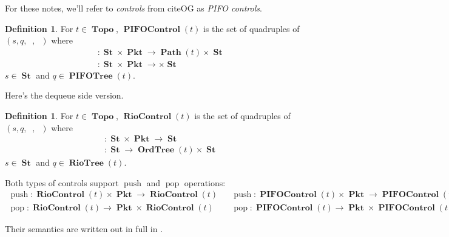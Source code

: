 \documentclass{amsart}
\DeclareMathOperator{\push}{\mathrm{push}}
\DeclareMathOperator{\pop}{\mathrm{pop}}
\DeclareMathOperator{\Pkt}{\mathbf{Pkt}}
\DeclareMathOperator{\Topo}{\mathbf{Topo}}
\DeclareMathOperator{\Path}{\mathbf{Path}}
\DeclareMathOperator{\PIFOTree}{\mathbf{PIFOTree}}
\DeclareMathOperator{\St}{\mathbf{St}}
\DeclareMathOperator{\zin}{z_{\mathrm{in}}}
\DeclareMathOperator{\zout}{z_{\mathrm{out}}}
\DeclareMathOperator{\RioTree}{\mathbf{RioTree}}
\DeclareMathOperator{\OrdTree}{\mathbf{OrdTree}}
\DeclareMathOperator{\PIFOControl}{\mathbf{PIFOControl}}
\DeclareMathOperator{\RioControl}{\mathbf{RioControl}}
\theoremstyle{definition}
\newtheorem{dfn}[thm]{Definition}
\begin{document}
For these notes, we'll refer to \emph{controls} from citeOG as \emph{PIFO controls}.

\begin{dfn}
    For $t \in \Topo$, $\PIFOControl(t)$ is the set of quadruples of $(s, q, \zin, \zout)$ where 
    \begin{align*}
        \zin &: \St \times \Pkt \to \Path(t) \times \St\\
        \zout &: \St \times \Pkt \to \times \St
    \end{align*}
    $s \in \St$ and $q \in \PIFOTree(t)$.
\end{dfn}

Here's the dequeue side version.

\begin{dfn}
    For $t \in \Topo$, $\RioControl(t)$ is the set of quadruples of $(s, q, \zin, \zout)$ where 
    \begin{align*}
        \zin &: \St \times \Pkt \to \St\\
        \zout &: \St \to \OrdTree(t) \times \St
    \end{align*}
    $s \in \St$ and $q \in \RioTree(t)$.
\end{dfn}

Both types of controls support $\push$ and $\pop$ operations:
\begin{align*}
    \push : \RioControl(t) \times \Pkt \to \RioControl(t) && 
    \push : \PIFOControl(t) \times \Pkt \to \PIFOControl(t)\\
    \pop : \RioControl(t) \to \Pkt \times \RioControl(t) && 
    \pop : \PIFOControl(t) \to \Pkt \times \PIFOControl(t)
\end{align*}

Their semantics are written out in full in .

\renewcommand\refname{\LARGE References}


\end{document}
